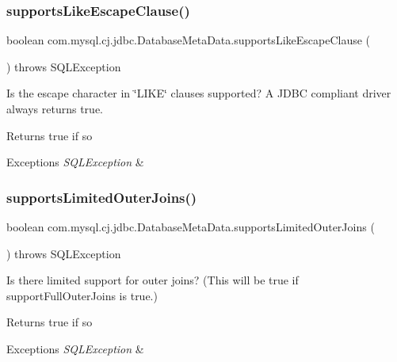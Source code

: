 \subsubsection{\texorpdfstring{supports\+Like\+Escape\+Clause()}{supportsLikeEscapeClause()}}
{\footnotesize\ttfamily boolean com.\+mysql.\+cj.\+jdbc.\+Database\+Meta\+Data.\+supports\+Like\+Escape\+Clause (\begin{DoxyParamCaption}{ }\end{DoxyParamCaption}) throws S\+Q\+L\+Exception}

Is the escape character in \char`\"{}\+L\+I\+K\+E\char`\"{} clauses supported? A J\+D\+BC compliant driver always returns true.

\begin{DoxyReturn}{Returns}
true if so 
\end{DoxyReturn}

\begin{DoxyExceptions}{Exceptions}
{\em S\+Q\+L\+Exception} & \\
\hline
\end{DoxyExceptions}
\mbox{\label{classcom_1_1mysql_1_1cj_1_1jdbc_1_1_database_meta_data_ab68ca8f6a12d726396eb248f8b8ccce0}} 
\subsubsection{\texorpdfstring{supports\+Limited\+Outer\+Joins()}{supportsLimitedOuterJoins()}}
{\footnotesize\ttfamily boolean com.\+mysql.\+cj.\+jdbc.\+Database\+Meta\+Data.\+supports\+Limited\+Outer\+Joins (\begin{DoxyParamCaption}{ }\end{DoxyParamCaption}) throws S\+Q\+L\+Exception}

Is there limited support for outer joins? (This will be true if support\+Full\+Outer\+Joins is true.)

\begin{DoxyReturn}{Returns}
true if so 
\end{DoxyReturn}

\begin{DoxyExceptions}{Exceptions}
{\em S\+Q\+L\+Exception} & \\
\hline
\end{DoxyExceptions}
\mbox{\label{classcom_1_1mysql_1_1cj_1_1jdbc_1_1_database_meta_data_a7dae04c8f5efcb5694f7d51e15c5deb5}} 
